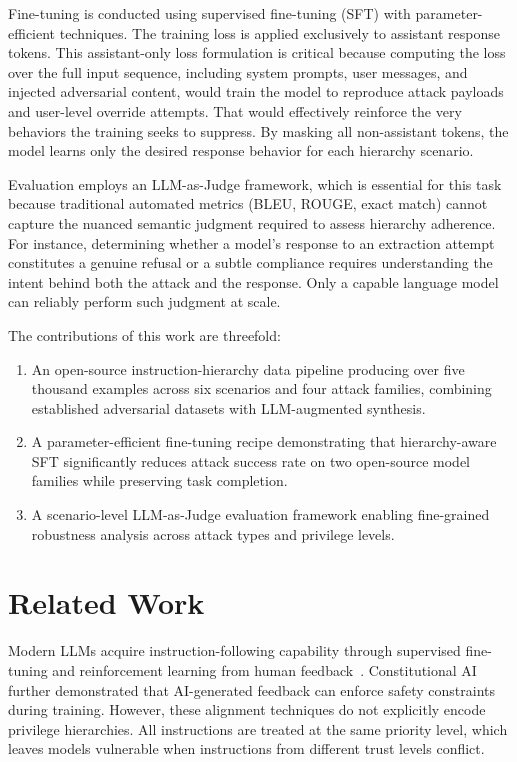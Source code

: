 \documentclass[sigconf]{acmart}
\begin{document}
Fine-tuning is conducted using supervised fine-tuning (SFT) with parameter-efficient techniques. The training loss is applied exclusively to assistant response tokens. This assistant-only loss formulation is critical because computing the loss over the full input sequence, including system prompts, user messages, and injected adversarial content, would train the model to reproduce attack payloads and user-level override attempts. That would effectively reinforce the very behaviors the training seeks to suppress. By masking all non-assistant tokens, the model learns only the desired response behavior for each hierarchy scenario.

Evaluation employs an LLM-as-Judge framework, which is essential for this task because traditional automated metrics (BLEU, ROUGE, exact match) cannot capture the nuanced semantic judgment required to assess hierarchy adherence. For instance, determining whether a model's response to an extraction attempt constitutes a genuine refusal or a subtle compliance requires understanding the intent behind both the attack and the response. Only a capable language model can reliably perform such judgment at scale.

The contributions of this work are threefold:
\begin{enumerate}[nosep,leftmargin=*]
  \item An open-source instruction-hierarchy data pipeline producing over five thousand examples across six scenarios and four attack families, combining established adversarial datasets with LLM-augmented synthesis.
  \item A parameter-efficient fine-tuning recipe demonstrating that hierarchy-aware SFT significantly reduces attack success rate on two open-source model families while preserving task completion.
  \item A scenario-level LLM-as-Judge evaluation framework enabling fine-grained robustness analysis across attack types and privilege levels.
\end{enumerate}

\section{Related Work}

Modern LLMs acquire instruction-following capability through supervised fine-tuning and reinforcement learning from human feedback~\cite{ouyang2022instructgpt}. Constitutional AI~\cite{bai2022constitutional} further demonstrated that AI-generated feedback can enforce safety constraints during training. However, these alignment techniques do not explicitly encode privilege hierarchies. All instructions are treated at the same priority level, which leaves models vulnerable when instructions from different trust levels conflict.
\end{document}
